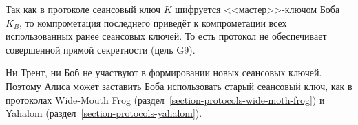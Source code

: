 Так как в протоколе сеансовый ключ $K$ шифруется <<мастер>>-ключом Боба $K_B$, то компрометация последнего приведёт к компрометации всех использованных ранее сеансовых ключей. То есть протокол не обеспечивает совершенной прямой секретности (цель G9).

Ни Трент, ни Боб не участвуют в формировании новых сеансовых ключей. Поэтому Алиса может заставить Боба использовать старый сеансовый ключ, как в протоколах Wide-Mouth Frog (раздел~\ref{section-protocols-wide-moth-frog}) и Yahalom (раздел~\ref{section-protocols-yahalom}).

